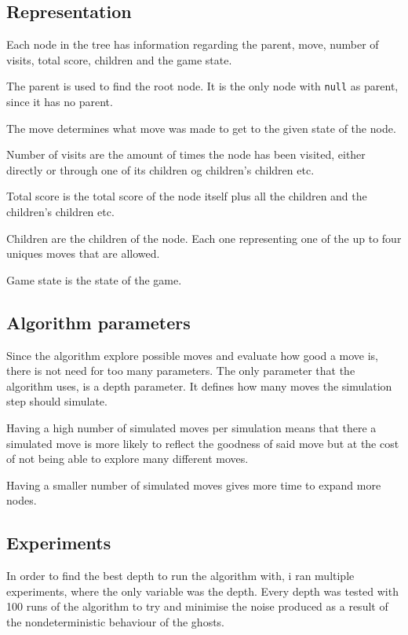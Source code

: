 \subsection{Representation}
Each node in the tree has information regarding the parent, move, number of visits, total score, children and the game state.

The parent is used to find the root node. It is the only node with \texttt{null} as parent, since it has no parent.

The move determines what move was made to get to the given state of the node.

Number of visits are the amount of times the node has been visited, either directly or through one of its children og children's children etc.

Total score is the total score of the node itself plus all the children and the children's children etc.

Children are the children of the node. Each one representing one of the up to four uniques moves that are allowed.

Game state is the state of the game.

\subsection{Algorithm parameters}
Since the algorithm explore possible moves and evaluate how good a move is, there is not need for too many parameters. The only parameter that the algorithm uses, is a depth parameter. It defines how many moves the simulation step should simulate.

Having a high number of simulated moves per simulation means that there a simulated move is more likely to reflect the goodness of said move but at the cost of not being able to explore many different moves.

Having a smaller number of simulated moves gives more time to expand more nodes.

\subsection{Experiments}
\label{sub:mcts_experiments}
In order to find the best depth to run the algorithm with, i ran multiple experiments, where the only variable was the depth. Every depth was tested with 100 runs of the algorithm to try and minimise the noise produced as a result of the nondeterministic behaviour of the ghosts.

